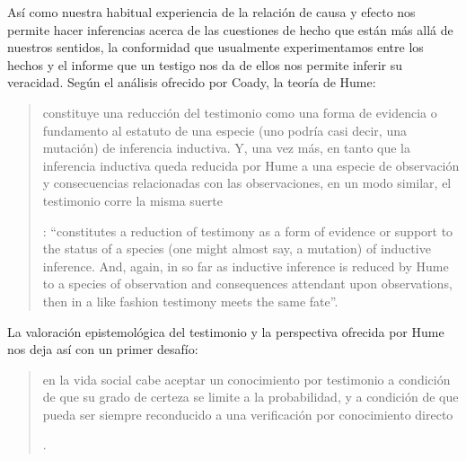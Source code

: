 Así como nuestra habitual experiencia de la relación de causa y efecto nos permite hacer inferencias acerca de las cuestiones de hecho que están más allá de nuestros sentidos, la conformidad que usualmente experimentamos entre los hechos y el informe que un testigo nos da de ellos nos permite inferir su veracidad. Según el análisis ofrecido por Coady, la teoría de Hume: \blockquote[{\Cite[79]{coady1992test}}: \enquote{constitutes a reduction of testimony as a form of evidence or support to the status of a species (one might almost say, a mutation) of inductive inference. And, again, in so far as inductive inference is reduced by Hume to a species of observation and consequences attendant upon observations, then in a like fashion testimony meets the same fate}.]{constituye una reducción del testimonio como una forma de evidencia o fundamento al estatuto de una especie (uno podría casi decir, una mutación) de inferencia inductiva. Y, una vez más, en tanto que la inferencia inductiva queda reducida por Hume a una especie de observación y consecuencias relacionadas con las observaciones, en un modo similar, el testimonio corre la misma suerte} La valoración epistemológica del testimonio y la perspectiva ofrecida por Hume nos deja así con un primer desafío: \blockquote[{\Cite[294]{prades2015testimonio}}.]{en la vida social cabe aceptar un conocimiento por testimonio a condición de que su grado de certeza se limite a la probabilidad, y a condición de que pueda ser siempre reconducido a una verificación por conocimiento directo}.

